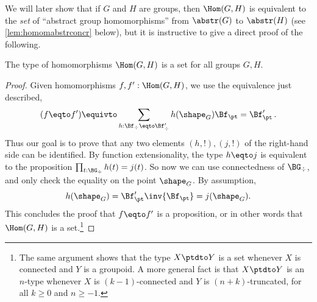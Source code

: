 We will later show that if $G$ and $H$ are groups, then $\Hom(G,H)$
is equivalent to the \emph{set} of ``abstract group homomorphisms''
from $\abstr(G)$ to $\abstr(H)$ (see \cref{lem:homomabstrconcr} below),
but it is instructive to give a direct proof of the following.
\begin{lemma}\label{lem:hom-is-set}
  The type of homomorphisms $\Hom(G,H)$
  is a set for all groups $G,H$.
\end{lemma}
\begin{proof}
  Given homomorphisms $f,f':\Hom(G,H)$, we use the equivalence just
  described,
  \[
    (f \eqto f') \equivto \sum_{h:\Bf_\div\eqto\Bf'_\div}
    h(\shape_G)\Bf_\pt = \Bf'_\pt \,.
  \]
  Thus our goal is to prove that any two elements $(h,!),(j,!)$ 
  of the right-hand side can be identified.
  By function extensionality, the type $h\eqto j$ is equivalent to
  the proposition $\prod_{t:\BG_\div} h(t) = j(t)$. So now we can use
  connectedness of $\BG_\div$, and
  only check the equality on the point $\shape_G$. By assumption,
  \begin{displaymath}
    h(\shape_G) = \Bf'_\pt \inv{\Bf_\pt} = j(\shape_G).
  \end{displaymath}
  This concludes the proof that $f\eqto f'$ is a proposition, or in other
  words that $\Hom(G,H)$ is a set.\footnote{%
    The same argument shows that the type $X\ptdto Y$ is a set
    whenever $X$ is connected and $Y$ is a groupoid.
    A more general fact is that $X \ptdto Y$ is an $n$-type
    whenever $X$ is $(k-1)$-connected and $Y$ is $(n+k)$-truncated,
    for all $k\ge0$ and $n\ge-1$.}
\end{proof}

